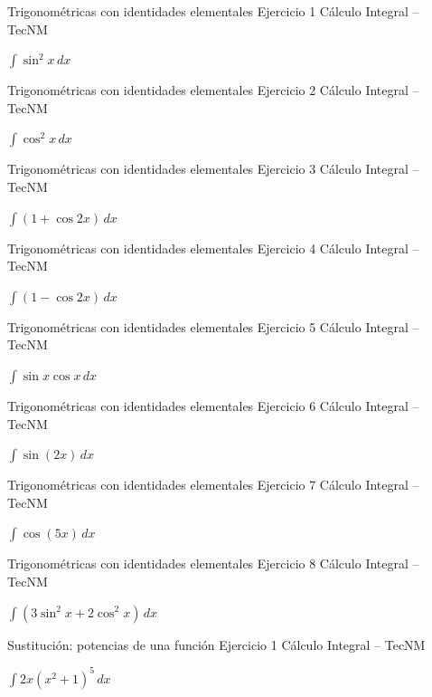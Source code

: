 \documentclass[aspectratio=169,12pt]{beamer}
\newcommand{\ejercicio}[1]{%
  \begin{center}
  \vfill
  {\fontsize{24}{30}\selectfont #1}
  \vfill
  \end{center}
}
\begin{document}
\begin{frame}{Trigonométricas con identidades elementales}
\small Ejercicio 1 \hfill Cálculo Integral -- TecNM
\ejercicio{$\displaystyle \int\sin^2x\,dx$}
\end{frame}

\begin{frame}{Trigonométricas con identidades elementales}
\small Ejercicio 2 \hfill Cálculo Integral -- TecNM
\ejercicio{$\displaystyle \int\cos^2x\,dx$}
\end{frame}

\begin{frame}{Trigonométricas con identidades elementales}
\small Ejercicio 3 \hfill Cálculo Integral -- TecNM
\ejercicio{$\displaystyle \int(1+\cos 2x)\,dx$}
\end{frame}

\begin{frame}{Trigonométricas con identidades elementales}
\small Ejercicio 4 \hfill Cálculo Integral -- TecNM
\ejercicio{$\displaystyle \int(1-\cos 2x)\,dx$}
\end{frame}

\begin{frame}{Trigonométricas con identidades elementales}
\small Ejercicio 5 \hfill Cálculo Integral -- TecNM
\ejercicio{$\displaystyle \int\sin x\cos x\,dx$}
\end{frame}

\begin{frame}{Trigonométricas con identidades elementales}
\small Ejercicio 6 \hfill Cálculo Integral -- TecNM
\ejercicio{$\displaystyle \int\sin(2x)\,dx$}
\end{frame}

\begin{frame}{Trigonométricas con identidades elementales}
\small Ejercicio 7 \hfill Cálculo Integral -- TecNM
\ejercicio{$\displaystyle \int\cos(5x)\,dx$}
\end{frame}

\begin{frame}{Trigonométricas con identidades elementales}
\small Ejercicio 8 \hfill Cálculo Integral -- TecNM
\ejercicio{$\displaystyle \int(3\sin^2x+2\cos^2x)\,dx$}
\end{frame}

\begin{frame}{Sustitución: potencias de una función}
\small Ejercicio 1 \hfill Cálculo Integral -- TecNM
\ejercicio{$\displaystyle \int 2x(x^2+1)^5\,dx$}
\end{frame}
\end{document}
